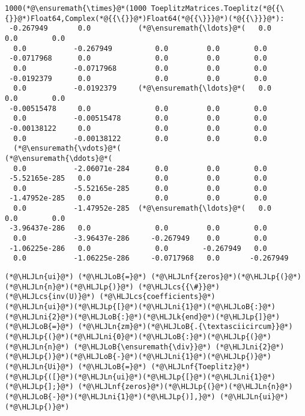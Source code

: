 \documentclass[12pt,landscape]{article}
\newcommand{\HLJLk}[1]{\textcolor[RGB]{148,91,176}{\textbf{#1}}}
\newcommand{\HLJLn}[1]{#1}
\newcommand{\HLJLnf}[1]{\textcolor[RGB]{66,102,213}{#1}}
\newcommand{\HLJLni}[1]{\textcolor[RGB]{59,151,46}{#1}}
\newcommand{\HLJLoB}[1]{\textcolor[RGB]{102,102,102}{\textbf{#1}}}
\newcommand{\HLJLp}[1]{#1}
\newcommand{\HLJLcs}[1]{\textcolor[RGB]{153,153,119}{\textit{#1}}}
\begin{document}
{\begin{lstlisting}
1000(*@\ensuremath{\times}@*(1000 ToeplitzMatrices.Toeplitz(*@{{\{}}@*)Float64,Complex(*@{{\{}}@*)Float64(*@{{\}}}@*)(*@{{\}}}@*):
 -0.267949       0.0           (*@\ensuremath{\ldots}@*(   0.0         0.0        0.0
  0.0           -0.267949          0.0         0.0        0.0
 -0.0717968      0.0               0.0         0.0        0.0
  0.0           -0.0717968         0.0         0.0        0.0
 -0.0192379      0.0               0.0         0.0        0.0
  0.0           -0.0192379     (*@\ensuremath{\ldots}@*(   0.0         0.0        0.0
 -0.00515478     0.0               0.0         0.0        0.0
  0.0           -0.00515478        0.0         0.0        0.0
 -0.00138122     0.0               0.0         0.0        0.0
  0.0           -0.00138122        0.0         0.0        0.0
  (*@\ensuremath{\vdots}@*(                            (*@\ensuremath{\ddots}@*(                         
  0.0           -2.06071e-284      0.0         0.0        0.0
 -5.52165e-285   0.0               0.0         0.0        0.0
  0.0           -5.52165e-285      0.0         0.0        0.0
 -1.47952e-285   0.0               0.0         0.0        0.0
  0.0           -1.47952e-285  (*@\ensuremath{\ldots}@*(   0.0         0.0        0.0
 -3.96437e-286   0.0               0.0         0.0        0.0
  0.0           -3.96437e-286     -0.267949    0.0        0.0
 -1.06225e-286   0.0               0.0        -0.267949   0.0
  0.0           -1.06225e-286     -0.0717968   0.0       -0.267949
\end{lstlisting}


\begin{lstlisting}
(*@\HLJLn{ui}@*) (*@\HLJLoB{=}@*) (*@\HLJLnf{zeros}@*)(*@\HLJLp{(}@*)(*@\HLJLn{n}@*)(*@\HLJLp{)}@*) (*@\HLJLcs{{\#}}@*) (*@\HLJLcs{inv(U)}@*) (*@\HLJLcs{coefficients}@*)
(*@\HLJLn{ui}@*)(*@\HLJLp{[}@*)(*@\HLJLni{1}@*)(*@\HLJLoB{:}@*)(*@\HLJLni{2}@*)(*@\HLJLoB{:}@*)(*@\HLJLk{end}@*)(*@\HLJLp{]}@*) (*@\HLJLoB{=}@*) (*@\HLJLn{zm}@*)(*@\HLJLoB{.{\textasciicircum}}@*)(*@\HLJLp{(}@*)(*@\HLJLni{0}@*)(*@\HLJLoB{:}@*)(*@\HLJLp{(}@*)(*@\HLJLn{n}@*) (*@\HLJLoB{\ensuremath{\div}}@*) (*@\HLJLni{2}@*)(*@\HLJLp{)}@*)(*@\HLJLoB{-}@*)(*@\HLJLni{1}@*)(*@\HLJLp{)}@*)
(*@\HLJLn{Ui}@*) (*@\HLJLoB{=}@*) (*@\HLJLnf{Toeplitz}@*)(*@\HLJLp{([}@*)(*@\HLJLn{ui}@*)(*@\HLJLp{[}@*)(*@\HLJLni{1}@*)(*@\HLJLp{];}@*) (*@\HLJLnf{zeros}@*)(*@\HLJLp{(}@*)(*@\HLJLn{n}@*)(*@\HLJLoB{-}@*)(*@\HLJLni{1}@*)(*@\HLJLp{)],}@*) (*@\HLJLn{ui}@*)(*@\HLJLp{)}@*)
\end{lstlisting}

}
\end{document}
